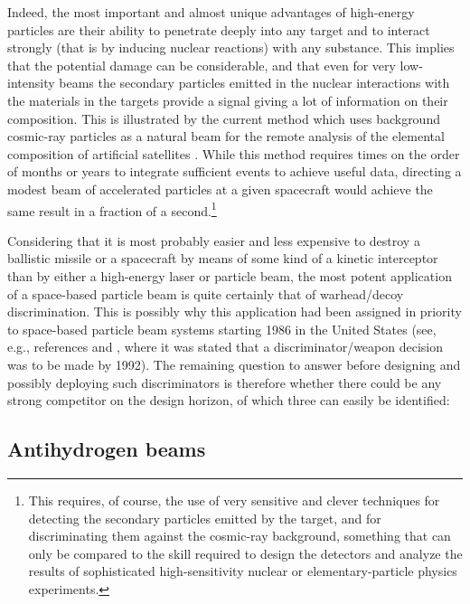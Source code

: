 \documentclass [12pt,a4paper,     ]{report} %
\begin{document}
Indeed, the most important and almost unique advantages of high-energy particles  are their ability to penetrate deeply into any target and to interact strongly (that is by inducing nuclear reactions) with any substance.  This implies that the potential damage can be considerable, and that even for very low-intensity beams the secondary particles emitted in the nuclear interactions with the materials in the targets provide a signal giving a lot of information on their composition.  This is illustrated by the current method which uses background cosmic-ray particles as a natural beam for the remote analysis of the elemental composition of artificial satellites \cite{HARRI1995-}.  While this method requires times on the order of months or years to integrate sufficient events to achieve useful data, directing a modest beam of accelerated particles at a given spacecraft would achieve the same result in a fraction of a second.\footnote{This requires, of course, the use of very sensitive and clever techniques for detecting the secondary particles emitted by the target, and for discriminating them against the cosmic-ray background, something that can only be compared to the skill required to design the detectors and analyze the results of sophisticated high-sensitivity nuclear or elementary-particle physics experiments.}

Considering that it is most probably easier and less expensive to destroy a ballistic missile or a spacecraft by means of some kind of a kinetic interceptor than by either a high-energy laser or particle beam, the most potent application of a space-based particle beam is quite certainly that of warhead/decoy discrimination.  This is possibly why this application had been assigned in priority to space-based particle beam systems starting 1986 in the United States (see, e.g., references \cite{BURIC1986-} and \cite{LAGTA1986-}, where it was stated that a discriminator/weapon decision was to be made by 1992).  The remaining question to answer before designing and possibly deploying such discriminators is therefore whether there could be any strong competitor on the design horizon, of which three can easily be identified:


\subsection{Antihydrogen beams}
\end{document}
